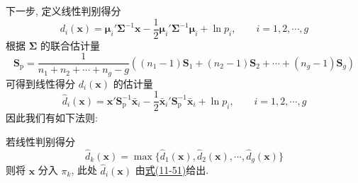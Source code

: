 下一步, 定义线性判别得分
\label{eq:11-49}
\begin{equation}
d_i(\mathbf{x})=\boldsymbol{\mu}_i'\boldsymbol{\Sigma}^{-1}\mathbf{x}-\frac{1}{2}\boldsymbol{\mu}_i'\boldsymbol{\Sigma}^{-1}\boldsymbol{\mu}_i+\ln p_i,\qquad i=1,2,\cdots,g
\tag{11-49}
\end{equation}
根据 $\boldsymbol{\Sigma}$ 的联合估计量
\label{eq:11-50}
\begin{equation}
\mathbf{S}_{\mathrm{p}}=\frac{1}{n_1+n_2+\cdots+n_g-g}((n_1-1)\mathbf{S}_1+(n_2-1)\mathbf{S}_2+\cdots+(n_g-1)\mathbf{S}_g)
\tag{11-50}
\end{equation}
可得到线性得分 $d_i(\mathbf{x})$ 的估计量
\label{eq:11-51}
\begin{equation}
\hat{d}_i(\mathbf{x})=\mathbf{x}'\mathbf{S}_{\mathrm{p}}^{-1}\bar{\mathbf{x}}_i-\frac{1}{2}\bar{\mathbf{x}}_i'\mathbf{S}_{\mathrm{p}}^{-1}\bar{\mathbf{x}}_i+\ln p_i,\qquad i=1,2,\cdots,g
\tag{11-51}
\end{equation}
因此我们有如下法则:

\begin{mvframe}
若线性判别得分
\label{eq:11-52}
\begin{equation}
\hat{d}_k(\mathbf{x})=\max\{\hat{d}_1(\mathbf{x}), \hat{d}_2(\mathbf{x}), \cdots, \hat{d}_g(\mathbf{x})\}
\tag{11-52}
\end{equation}
则将 $\mathbf{x}$ 分入 $\pi_k$, 此处 $\hat{d}_i(\mathbf{x})$ 由\hyperref[eq:11-51]{式(11-51)}给出.
\end{mvframe}
